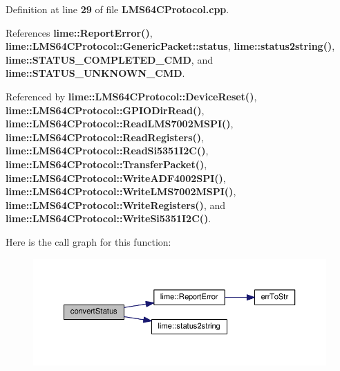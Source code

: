 Definition at line {\bf 29} of file {\bf L\+M\+S64\+C\+Protocol.\+cpp}.



References {\bf lime\+::\+Report\+Error()}, {\bf lime\+::\+L\+M\+S64\+C\+Protocol\+::\+Generic\+Packet\+::status}, {\bf lime\+::status2string()}, {\bf lime\+::\+S\+T\+A\+T\+U\+S\+\_\+\+C\+O\+M\+P\+L\+E\+T\+E\+D\+\_\+\+C\+MD}, and {\bf lime\+::\+S\+T\+A\+T\+U\+S\+\_\+\+U\+N\+K\+N\+O\+W\+N\+\_\+\+C\+MD}.



Referenced by {\bf lime\+::\+L\+M\+S64\+C\+Protocol\+::\+Device\+Reset()}, {\bf lime\+::\+L\+M\+S64\+C\+Protocol\+::\+G\+P\+I\+O\+Dir\+Read()}, {\bf lime\+::\+L\+M\+S64\+C\+Protocol\+::\+Read\+L\+M\+S7002\+M\+S\+P\+I()}, {\bf lime\+::\+L\+M\+S64\+C\+Protocol\+::\+Read\+Registers()}, {\bf lime\+::\+L\+M\+S64\+C\+Protocol\+::\+Read\+Si5351\+I2\+C()}, {\bf lime\+::\+L\+M\+S64\+C\+Protocol\+::\+Transfer\+Packet()}, {\bf lime\+::\+L\+M\+S64\+C\+Protocol\+::\+Write\+A\+D\+F4002\+S\+P\+I()}, {\bf lime\+::\+L\+M\+S64\+C\+Protocol\+::\+Write\+L\+M\+S7002\+M\+S\+P\+I()}, {\bf lime\+::\+L\+M\+S64\+C\+Protocol\+::\+Write\+Registers()}, and {\bf lime\+::\+L\+M\+S64\+C\+Protocol\+::\+Write\+Si5351\+I2\+C()}.



Here is the call graph for this function\+:
\nopagebreak
\begin{figure}[H]
\begin{center}
\leavevmode
\includegraphics[width=350pt]{d2/d65/LMS64CProtocol_8cpp_af62b1cc795d9086a8ad8d7164b0cad8b_cgraph}
\end{center}
\end{figure}





